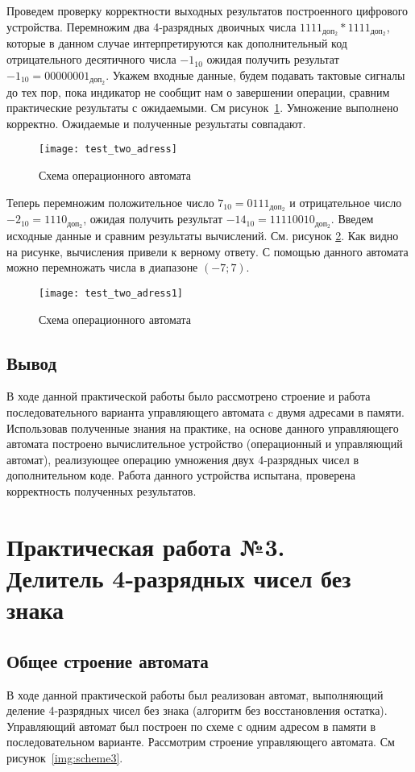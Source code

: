 \documentclass[a4paper,14pt]{extarticle}
\begin{document}
Проведем проверку корректности выходных результатов построенного цифрового устройства. Перемножим два  4-разрядных двоичных числа $1111_{доп_2} \ast 1111_{доп_2}$, которые в данном случае интерпретируются как дополнительный код отрицательного десятичного числа $-1_{10}$ ожидая получить результат $-1_{10} = 00000001_{доп_2}$. Укажем входные данные, будем подавать тактовые сигналы до тех пор, пока индикатор не сообщит нам о завершении операции, сравним практические результаты с ожидаемыми. См рисунок~\ref{img:test2.1}. Умножение выполнено корректно. Ожидаемые и полученные результаты совпадают.
\begin{figure}[h!]
	\centering
	\texttt{[image: test\_two\_adress]}
	\caption {Схема операционного автомата}
	\label{img:test2.1}
\end{figure}

Теперь перемножим положительное число $7_{10}=0111_{доп_2}$ и отрицательное число $-2_{10}=1110_{доп_2}$, ожидая получить результат $-14_{10}=11110010_{доп_2}$. Введем исходные данные и сравним результаты вычислений. См. рисунок \ref{img:test2.2}. Как видно на рисунке, вычисления привели к верному ответу. С помощью данного автомата можно перемножать числа в диапазоне $(-7;7)$.
\begin{figure}[h!]
	\centering
	\texttt{[image: test\_two\_adress1]}
	\caption {Схема операционного автомата}
	\label{img:test2.2}
\end{figure}

\subsection {Вывод}
В ходе данной практической работы было рассмотрено строение и работа последовательного варианта управляющего автомата c двумя адресами в памяти. Использовав полученные знания на практике, на основе данного управляющего автомата построено вычислительное устройство (операционный и управляющий автомат), реализующее операцию умножения двух 4-разрядных чисел в дополнительном коде. Работа данного устройства испытана, проверена корректность полученных результатов.
\newpage
\section {Практическая работа №3.\\Делитель 4-разрядных чисел без знака }

\subsection{Общее строение автомата}
В ходе данной практической работы был реализован автомат, выполняющий деление 4-разрядных чисел без знака (алгоритм без восстановления остатка). Управляющий автомат был построен по схеме с одним адресом в памяти в последовательном варианте. Рассмотрим строение управляющего автомата. См рисунок~\ref{img:scheme3}.
\end{document}
